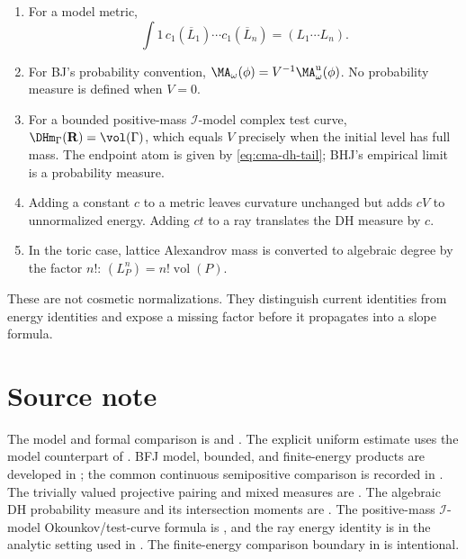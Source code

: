 \begin{enumerate}
\item For a model metric,
\[
 \int 1\,c_1(\overline L_1)\cdots c_1(\overline L_n)
 =(L_1\cdots L_n).
\]

\item For BJ's probability convention,
$\MA_\omega(\phi)=V^{-1}\MA^{\mathrm u}_\omega(\phi)$.
No probability measure is defined when $V=0$.

\item For a bounded positive-mass $\mathcal I$-model complex test curve,
$\DHm_\Gamma(\mathbf R)=\vol(\Gamma)$, which equals $V$ precisely when the
initial level has full mass. The endpoint atom is given by
\eqref{eq:cma-dh-tail}; BHJ's empirical limit is a probability measure.

\item Adding a constant $c$ to a metric leaves curvature unchanged but
adds $cV$ to unnormalized energy.
Adding $ct$ to a ray translates the DH measure by $c$.

\item In the toric case, lattice Alexandrov mass is converted to algebraic
degree by the factor $n!$:
$(L_P^n)=n!\operatorname{vol}(P)$.
\end{enumerate}

These are not cosmetic normalizations.
They distinguish current identities from energy identities and expose a
missing factor before it propagates into a slope formula.

\section*{Source note}
\label{sec:cma-source}

The model and formal comparison is
\cite[Theorem~18.5.5 and Proposition~18.5.8]{CLD25} and \cite{CL06}.
The explicit uniform estimate uses the model counterpart of
\cite[Lemma~8.6 and the proof of Theorem~8.4]{BE21}.
BFJ model, bounded, and finite-energy products are developed in
\cite{BFJ15}; the common continuous semipositive comparison is recorded in
.
The trivially valued projective pairing and mixed measures are
\cite[Sections~3 and~7]{BJ22}.
The algebraic DH probability measure and its intersection moments are
\cite[Theorem~3.1 and Corollary~3.4]{BHJ17}.
The positive-mass $\mathcal I$-model Okounkov/test-curve formula is
, and the ray energy identity is
\cite{RWN14} in the analytic setting used in .
The finite-energy comparison boundary in
 is intentional.

